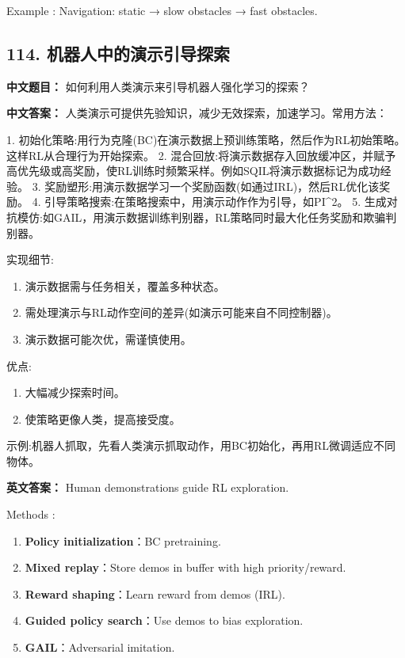 \documentclass[10pt,a4paper]{ctexart}
\begin{document}
 Example : Navigation: static → slow obstacles → fast obstacles.

\subsection*{114. 机器人中的演示引导探索}
\textbf{中文题目：} 如何利用人类演示来引导机器人强化学习的探索？

\textbf{中文答案：}  
人类演示可提供先验知识，减少无效探索，加速学习。常用方法：

1.  初始化策略:用行为克隆(BC)在演示数据上预训练策略，然后作为RL初始策略。这样RL从合理行为开始探索。
2.  混合回放:将演示数据存入回放缓冲区，并赋予高优先级或高奖励，使RL训练时频繁采样。例如SQIL将演示数据标记为成功经验。
3.  奖励塑形:用演示数据学习一个奖励函数(如通过IRL)，然后RL优化该奖励。
4.  引导策略搜索:在策略搜索中，用演示动作作为引导，如PI^2。
5.  生成对抗模仿:如GAIL，用演示数据训练判别器，RL策略同时最大化任务奖励和欺骗判别器。

 实现细节:
\begin{enumerate}
    \item 演示数据需与任务相关，覆盖多种状态。
    \item 需处理演示与RL动作空间的差异(如演示可能来自不同控制器)。
    \item 演示数据可能次优，需谨慎使用。
\end{enumerate}

 优点:
\begin{enumerate}
    \item 大幅减少探索时间。
    \item 使策略更像人类，提高接受度。
\end{enumerate}

 示例:机器人抓取，先看人类演示抓取动作，用BC初始化，再用RL微调适应不同物体。

\textbf{英文答案：}  
Human demonstrations guide RL exploration.

 Methods :
\begin{enumerate}
    \item \textbf{Policy initialization}：BC pretraining.
    \item \textbf{Mixed replay}：Store demos in buffer with high priority/reward.
    \item \textbf{Reward shaping}：Learn reward from demos (IRL).
    \item \textbf{Guided policy search}：Use demos to bias exploration.
    \item \textbf{GAIL}：Adversarial imitation.
\end{enumerate}
\end{document}
